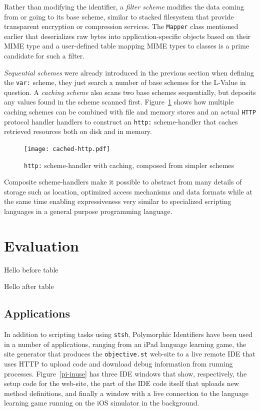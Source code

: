 \documentclass[preprint]{sigplanconf}
\begin{document}
Rather than modifying the identifier, a \emph{filter scheme} modifies the data coming
from or going to its base scheme, similar to stacked filesystem that provide transparent
encryption or compression services.  The {\tt Mapper} class mentioned earlier that 
deserializes raw bytes into application-specific objects based on their MIME type 
and a user-defined table mapping MIME types to classes is a prime candidate for
such a filter.  

\emph{Sequential schemes} were already introduced in the previous section when defining
the {\tt var:} scheme, they just search a number of base schemes for the L-Value in question.
A \emph{caching scheme} also scans two base schemes sequentially, but deposits any 
values found in the scheme scanned first.  Figure~\ref{fig:http-cached} shows how multiple
caching schemes can be combined with file and memory stores and an actual {\tt HTTP}
protocol handler handlers to construct an {\tt http:} scheme-handler that caches retrieved
resources both on disk and in memory.

\begin{figure}[htbp]
\centering
\texttt{[image: cached-http.pdf]}
\caption{{\tt http:} scheme-handler with caching, composed from simpler schemes}
\label{fig:http-cached}
\end{figure}

Composite scheme-handlers make it possible to abstract from many details of storage
such as location, optimized access mechanisms and data formats while at the same
time enabling expressiveness very similar to specialized scripting languages in
a general purpose programming language.


\section{Evaluation}
\label{evaluation}

Hello before table


Hello after table


\subsection{Applications}

In addition to scripting tasks using {\tt stsh}, Polymorphic Identifiers have been used in a number
of applications, ranging from an iPad language learning game, the site generator that produces the {\tt objective.st} web-site to a
live remote IDE that uses HTTP to upload code and download debug information from running processes.  Figure~\ref{pi-inuse}
has three IDE windows that show, respectively, the setup code for the web-site, the part of the IDE code itself that uploads new method definitions,
and finally a window with a live connection to the language learning game running on the iOS simulator in the background.
\end{document}
